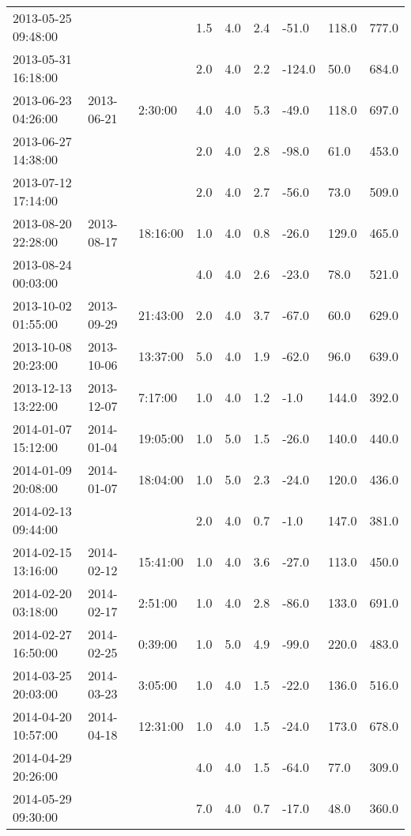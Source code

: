 \begin{longtable}{lllllllll}
        2013-05-25 09:48:00 & ~ & ~ & 1.5 & 4.0 & 2.4 & -51.0 & 118.0 & 777.0 \\ 
        2013-05-31 16:18:00 & ~ & ~ & 2.0 & 4.0 & 2.2 & -124.0 & 50.0 & 684.0 \\ 
        2013-06-23 04:26:00 & 2013-06-21 & 2:30:00 & 4.0 & 4.0 & 5.3 & -49.0 & 118.0 & 697.0 \\ 
        2013-06-27 14:38:00 & ~ & ~ & 2.0 & 4.0 & 2.8 & -98.0 & 61.0 & 453.0 \\ 
        2013-07-12 17:14:00 & ~ & ~ & 2.0 & 4.0 & 2.7 & -56.0 & 73.0 & 509.0 \\ 
        2013-08-20 22:28:00 & 2013-08-17 & 18:16:00 & 1.0 & 4.0 & 0.8 & -26.0 & 129.0 & 465.0 \\ 
        2013-08-24 00:03:00 & ~ & ~ & 4.0 & 4.0 & 2.6 & -23.0 & 78.0 & 521.0 \\ 
        2013-10-02 01:55:00 & 2013-09-29 & 21:43:00 & 2.0 & 4.0 & 3.7 & -67.0 & 60.0 & 629.0 \\ 
        2013-10-08 20:23:00 & 2013-10-06 & 13:37:00 & 5.0 & 4.0 & 1.9 & -62.0 & 96.0 & 639.0 \\ 
        2013-12-13 13:22:00 & 2013-12-07 & 7:17:00 & 1.0 & 4.0 & 1.2 & -1.0 & 144.0 & 392.0 \\ 
        2014-01-07 15:12:00 & 2014-01-04 & 19:05:00 & 1.0 & 5.0 & 1.5 & -26.0 & 140.0 & 440.0 \\ 
        2014-01-09 20:08:00 & 2014-01-07 & 18:04:00 & 1.0 & 5.0 & 2.3 & -24.0 & 120.0 & 436.0 \\ 
        2014-02-13 09:44:00 & ~ & ~ & 2.0 & 4.0 & 0.7 & -1.0 & 147.0 & 381.0 \\ 
        2014-02-15 13:16:00 & 2014-02-12 & 15:41:00 & 1.0 & 4.0 & 3.6 & -27.0 & 113.0 & 450.0 \\ 
        2014-02-20 03:18:00 & 2014-02-17 & 2:51:00 & 1.0 & 4.0 & 2.8 & -86.0 & 133.0 & 691.0 \\ 
        2014-02-27 16:50:00 & 2014-02-25 & 0:39:00 & 1.0 & 5.0 & 4.9 & -99.0 & 220.0 & 483.0 \\ 
        2014-03-25 20:03:00 & 2014-03-23 & 3:05:00 & 1.0 & 4.0 & 1.5 & -22.0 & 136.0 & 516.0 \\ 
        2014-04-20 10:57:00 & 2014-04-18 & 12:31:00 & 1.0 & 4.0 & 1.5 & -24.0 & 173.0 & 678.0 \\ 
        2014-04-29 20:26:00 & ~ & ~ & 4.0 & 4.0 & 1.5 & -64.0 & 77.0 & 309.0 \\ 
        2014-05-29 09:30:00 & ~ & ~ & 7.0 & 4.0 & 0.7 & -17.0 & 48.0 & 360.0 \\ 

\end{longtable}
